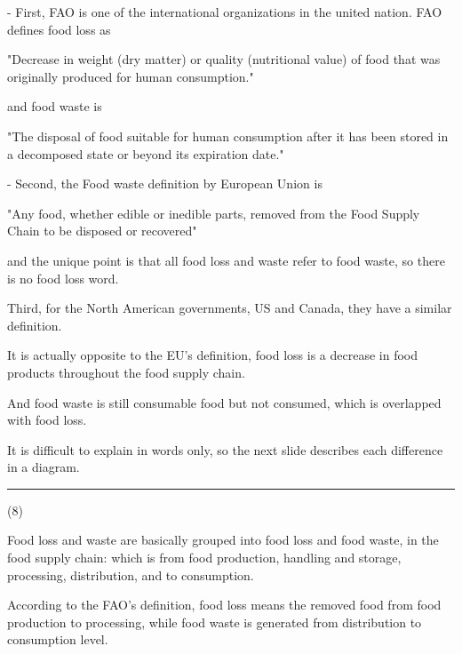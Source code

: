 \documentclass{article}
\begin{document}
\begin{multicols}{2}
\begin{spacing}{1.1}
\vspace{1em}
- First, FAO is one of the international organizations in the united nation.
FAO defines food loss as

"Decrease in weight (dry matter) or quality (nutritional value) of food that was originally produced for human consumption."

and food waste is 

"The disposal of food suitable for human consumption after it has been stored in a decomposed state or beyond its expiration date."

\vspace{1em}

- Second, the Food waste definition by European Union is 

"Any food, whether edible or inedible parts, removed from the Food Supply Chain to be disposed or recovered"

and the unique point is that all food loss and waste refer to food waste, 
so there is no food loss word.

\vspace{1em}

Third, for the North American governments, US and Canada, 
they have a similar definition.

It is actually opposite to the EU's definition,
food loss is a decrease in food products throughout the food supply chain.

And food waste is still consumable food but not consumed, which is overlapped with food loss.

\vspace{1em}

It is difficult to explain in words only, 
so the next slide describes each difference in a diagram.

\noindent\rule{0.1\textwidth}{1pt}\small(8)

Food loss and waste are basically grouped into food loss and food waste, 
in the food supply chain: 
which is from food production, handling and storage, processing, distribution, and to consumption.

\vspace{1em}

According to the FAO's definition, 
food loss means the removed food from food production to processing, 
while food waste is generated from distribution to consumption level.


\end{spacing}
\end{multicols}
\end{document}
